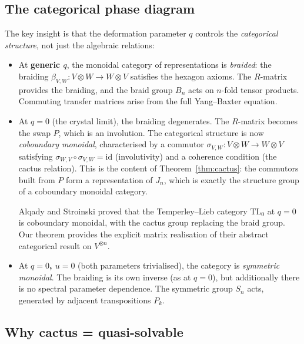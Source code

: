 \documentclass[11pt]{article}
\theoremstyle{remark}
\begin{document}
\subsection*{The categorical phase diagram}

The key insight is that the deformation parameter $q$ controls the
\emph{categorical structure}, not just the algebraic relations:

\begin{itemize}
  \item At \textbf{generic $q$}, the monoidal category of representations is
    \emph{braided}: the braiding $\beta_{V,W}\colon V \otimes W \to
    W \otimes V$ satisfies the hexagon axioms. The $R$-matrix provides
    the braiding, and the braid group $B_n$ acts on $n$-fold tensor products.
    Commuting transfer matrices arise from the full Yang--Baxter equation.

  \item At \textbf{$q = 0$} (the crystal limit), the braiding degenerates.
    The $R$-matrix becomes the swap $P$, which is an involution. The
    categorical structure is now \emph{coboundary monoidal}, characterised
    by a commutor $\sigma_{V,W}\colon V \otimes W \to W \otimes V$
    satisfying $\sigma_{W,V} \circ \sigma_{V,W} = \mathrm{id}$
    (involutivity) and a coherence condition (the cactus relation).
    This is the content of Theorem~\ref{thm:cactus}: the commutors built
    from $P$ form a representation of $J_n$, which is exactly the
    structure group of a coboundary monoidal category.

    Alqady and Stroinski proved that the Temperley--Lieb category $\mathrm{TL}_0$
    at $q = 0$ is coboundary monoidal, with the cactus group replacing
    the braid group. Our theorem provides the explicit matrix realisation
    of their abstract categorical result on $V^{\otimes n}$.

  \item At \textbf{$q = 0$, $u = 0$} (both parameters trivialised), the
    category is \emph{symmetric monoidal}. The braiding is its own inverse
    (as at $q = 0$), but additionally there is no spectral parameter
    dependence. The symmetric group $S_n$ acts, generated by adjacent
    transpositions $P_k$.
\end{itemize}

\subsection*{Why cactus = quasi-solvable}
\end{document}

